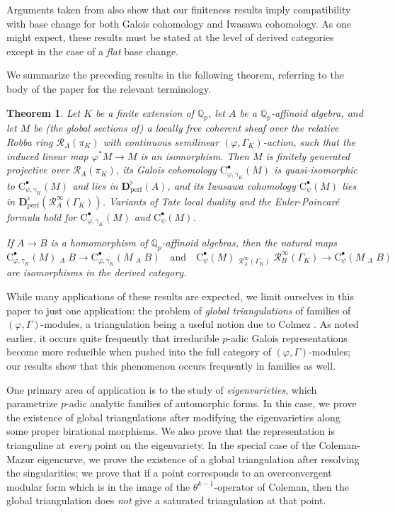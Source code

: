 \documentclass[12pt]{article}
\newtheorem*{theoremstar}{Theorem}
\theoremstyle{definition}
\numberwithin{equation}{theorem}
\newcommand{\calR}{\mathcal{R}}
\newcommand{\QQ}{\mathbb{Q}}
\newcommand{\bbD}{\mathbf{D}}
\newcommand{\bbL}{\mathbf{L}}
\newcommand{\rmC}{\mathrm{C}}
\newcommand{\perf}{\mathrm{perf}}
\def\Qp{\QQ_p}
\newcommand{\whotimes}{\mathop{\widehat{\otimes}}}
\newcommand{\Lotimes}{\mathop{\stackrel{\bbL}{\otimes}}}
\begin{document}
Arguments taken from \cite{pottharst2} also show that our finiteness
results imply compatibility
with base change for both Galois cohomology and Iwasawa cohomology. As
one might expect, these results must be stated at the
level of derived categories except in the case of a \emph{flat} base
change.

We summarize the preceding results in the following theorem, referring to the body of the paper for the relevant terminology.

\begin{theoremstar}
Let $K$ be a finite extension of $\Qp$, let $A$ be a $\Qp$-affinoid
algebra, and let $M$ be (the global sections of) a locally free
coherent sheaf over the relative Robba ring $\calR_A(\pi_K)$ with
continuous semilinear $(\varphi,\Gamma_K)$-action, such that the
induced linear map $\varphi^*M \to M$ is an isomorphism.  Then $M$ is
finitely generated projective over $\calR_A(\pi_K)$, its Galois
cohomology $\rmC_{\varphi,\gamma_K}^\bullet(M)$ is quasi-isomorphic to
$\rmC_{\psi,\gamma_K}^\bullet(M)$ and lies in $\bbD_\perf^\flat(A)$,
and its Iwasawa cohomology $\rmC_\psi^\bullet(M)$ lies in
$\bbD_\perf^\flat(\calR_A^\infty(\Gamma_K))$.  Variants of Tate local
duality and the Euler-Poincar\'e formula hold for
$\rmC_{\varphi,\gamma_K}^\bullet(M)$ and $\rmC_\psi^\bullet(M)$.

If $A \to B$ is a homomorphism of $\Qp$-affinoid algebras, then the natural maps
\[
\rmC_{\varphi,\gamma_K}^\bullet(M) \Lotimes_A B \to \rmC_{\varphi,\gamma_K}^\bullet(M \whotimes_A B) \quad \text{and} \quad \rmC_\psi^\bullet(M) \Lotimes_{\calR_A^\infty(\Gamma_K)} \calR_B^\infty(\Gamma_K) \to \rmC_\psi^\bullet(M \whotimes_A B)
\]
are isomorphisms in the derived category.
\end{theoremstar}

While many applications of these results are expected, we limit
ourselves in this paper to just one application: the problem of
\emph{global triangulations} of families of $(\varphi,
\Gamma)$-modules, a triangulation being a useful notion due to Colmez
\cite{colmez}. As noted earlier, it occurs quite frequently that
irreducible $p$-adic Galois representations become more reducible when
pushed into the full category of $(\varphi, \Gamma)$-modules; our
results show that this phenomenon occurs frequently in families as
well.

One primary area of application is to
the study of \emph{eigenvarieties}, which parametrize $p$-adic
analytic families of automorphic forms.  
In this case, we prove the existence of global triangulations after modifying the eigenvarieties along some proper birational morphisms.  We also prove that the representation is trianguline at \emph{every} point on the eigenvariety.
In the special case of the Coleman-Mazur eigencurve, we prove the existence of a global triangulation after resolving the singularities; we prove that if a point corresponds to an overconvergent modular form which is in the image of the $\theta^{k-1}$-operator of Coleman, then the global triangulation does \emph{not} give a saturated triangulation at that point.
\end{document}
